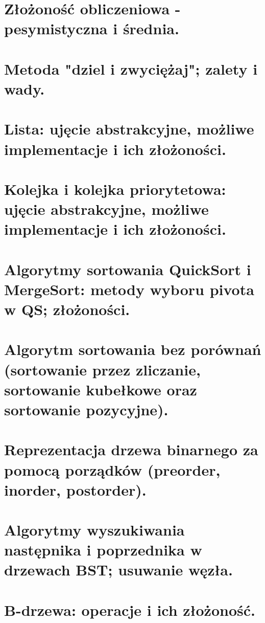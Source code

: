 \documentclass[12pt]{article}
\begin{document}
    \newpage

    \section{Złożoność obliczeniowa - pesymistyczna i średnia.}

    \newpage

    \section{Metoda "dziel i zwyciężaj"; zalety i wady.}
    \section{Lista: ujęcie abstrakcyjne, możliwe implementacje i ich złożoności.}
    \section{Kolejka i kolejka priorytetowa: ujęcie abstrakcyjne, możliwe implementacje i ich złożoności.}

    \newpage

    \section{Algorytmy sortowania QuickSort i MergeSort: metody wyboru pivota w QS; złożoności.}

    \newpage

    \section{Algorytm sortowania bez porównań (sortowanie przez zliczanie, sortowanie kubełkowe oraz sortowanie pozycyjne).}

    \newpage

    \section{Reprezentacja drzewa binarnego za pomocą porządków (preorder, inorder, postorder).}

    \newpage

    \section{Algorytmy wyszukiwania następnika i poprzednika w drzewach BST; usuwanie węzła.}
    \section{B-drzewa: operacje i ich złożoność.}
\end{document}
